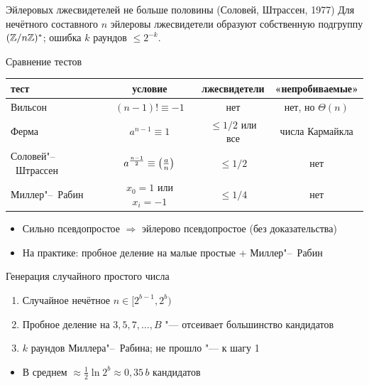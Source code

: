 \documentclass{ca-slides}
\begin{document}
\begin{theoremframe}{Эйлеровых лжесвидетелей не больше половины}
  (Соловей, Штрассен, 1977) Для нечётного составного $n$ эйлеровы лжесвидетели образуют
  собственную подгруппу $(\mathbb{Z}/n\mathbb{Z})^{*}$; ошибка $k$ раундов $\le 2^{-k}$.
\end{theoremframe}

\begin{canvasframe}{Сравнение тестов}
  \small
  \begin{center}
  \begin{tabular}{l|c|c|c}
    тест & условие & лжесвидетели & «непробиваемые» \\ \hline
    Вильсон & $(n-1)! \equiv -1$ & нет & нет, но $\Theta(n)$ \\
    Ферма & $a^{n-1} \equiv 1$ & $\le 1/2$ или все & числа Кармайкла \\
    Соловей"--~Штрассен & $a^{\frac{n-1}{2}} \equiv \left(\frac{a}{n}\right)$ & $\le 1/2$ & нет \\
    Миллер"--~Рабин & $x_0 = 1$ или $x_i = -1$ & $\le 1/4$ & нет
  \end{tabular}
  \end{center}
  \begin{itemize}
    \item Сильно псевдопростое $\Rightarrow$ эйлерово псевдопростое (без доказательства)
    \item На практике: пробное деление на малые простые + Миллер"--~Рабин
  \end{itemize}
\end{canvasframe}

\begin{canvasframe}{Генерация случайного простого числа}
  \begin{enumerate}
    \item Случайное нечётное $n \in [2^{b-1}, 2^b)$
    \item Пробное деление на $3, 5, 7, \ldots, B$ "--- отсеивает большинство кандидатов
    \item $k$ раундов Миллера"--~Рабина; не прошло "--- к шагу 1
  \end{enumerate}
  \begin{itemize}
    \item В среднем $\approx \frac12 \ln 2^b \approx 0{,}35\,b$ кандидатов
  \end{itemize}
  \notearea[0.25\textheight]
\end{canvasframe}
\end{document}
